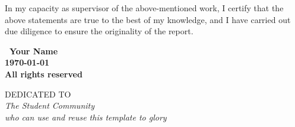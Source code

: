 \documentclass[oneside,12pt]{IIScthesisPSnPDF}
\newcommand{\blankpage}{
\newpage
\thispagestyle{empty}
\mbox{}
\newpage
}
\begin{document}
\noindent In my capacity as supervisor of the above-mentioned work, I certify
that the above statements are true to the best of my knowledge, and 
I have carried out due diligence to ensure the originality of the
report.

\vspace{20mm}

 \qquad



\blankpage

\vspace*{\fill}
\begin{center}
\large\bf \textcopyright \ Your Name\\
\large\bf \monthyeardate\today\\
\large\bf All rights reserved
\end{center}
\vspace*{\fill}
\thispagestyle{empty}

\blankpage

\vspace*{\fill}
\begin{center}
DEDICATED TO \\[2em]
\Large\it The Student Community\\[2em]
\Large\it who can use and reuse this template to glory
\end{center}
\vspace*{\fill}
\thispagestyle{empty}

%

\end{document}

